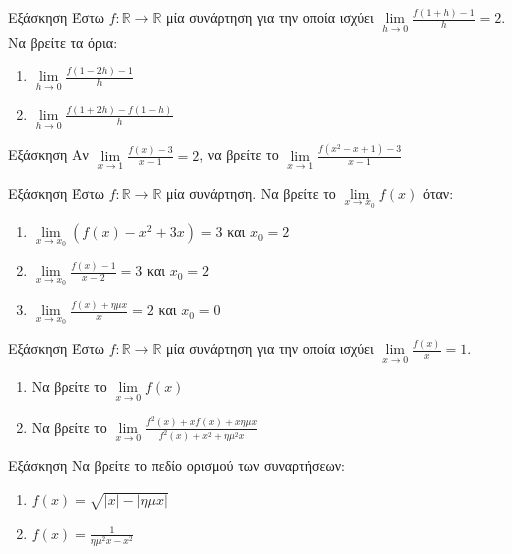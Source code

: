 \documentclass[greek]{beamer}
\begin{document}
\begin{frame}{Εξάσκηση}
 Έστω $f:\mathbb{R}\to\mathbb{R}$ μία συνάρτηση για την οποία ισχύει $\lim\limits_{h \to 0}{ \frac{f(1+h)-1}{h} }=2$. Να βρείτε τα όρια:
 \begin{enumerate}
  \item $\lim\limits_{h \to 0}{ \frac{f(1-2h)-1}{h} }$ \pause
  \item $\lim\limits_{h \to 0}{ \frac{f(1+2h)-f(1-h)}{h} }$
 \end{enumerate}
\end{frame}

\begin{frame}{Εξάσκηση}
 Αν $\lim\limits_{x \to 1}{ \frac{f(x)-3}{x-1} }=2$, να βρείτε το $\lim\limits_{x \to 1}{ \frac{f(x^2-x+1)-3}{x-1} }$
\end{frame}

\begin{frame}{Εξάσκηση}
 Έστω $f:\mathbb{R}\to\mathbb{R}$ μία συνάρτηση. Να βρείτε το $\lim\limits_{x \to x_0}{ f(x) }$ όταν:
 \begin{enumerate}
  \item $\lim\limits_{x \to x_0}{\left(f(x)-x^2+3x  \right)=3  }$ και $x_0=2$ \pause
  \item $\lim\limits_{x \to x_0}{\frac{f(x)-1}{x-2}=3  }$ και $x_0=2$ \pause
  \item $\lim\limits_{x \to x_0}{\frac{f(x)+ημx}{x}=2  }$ και $x_0=0$
 \end{enumerate}
\end{frame}

\begin{frame}{Εξάσκηση}
 Έστω $f:\mathbb{R}\to\mathbb{R}$ μία συνάρτηση για την οποία ισχύει $\lim\limits_{x \to 0}{ \frac{f(x)}{x} }=1$.
 \begin{enumerate}
  \item Να βρείτε το $\lim\limits_{x \to 0}{f(x)}$ \pause
  \item Να βρείτε το $\lim\limits_{x \to 0}{\frac{f^2(x)+xf(x)+xημx}{f^2(x)+x^2+ημ^2x}}$
 \end{enumerate}
\end{frame}

\begin{frame}{Εξάσκηση}
 Να βρείτε το πεδίο ορισμού των συναρτήσεων:
 \begin{enumerate}
  \item $f(x)=\sqrt{|x|-|ημx|}$ \pause
  \item $f(x)=\frac{1}{ημ^2x-x^2}$
 \end{enumerate}
\end{frame}
\end{document}
